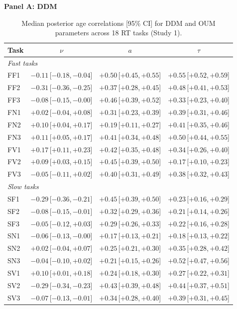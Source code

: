 \begin{table}[ht]
\centering
\caption{Median posterior age correlations [95\% CI] for DDM and OUM parameters across 18 RT tasks (Study 1).}
\label{tab:age_correlations_sfi}
\tiny
\setlength{\tabcolsep}{3pt}
\renewcommand{\arraystretch}{0.9}

\textbf{Panel A: DDM}\par\vspace{2pt}
\begin{tabular}{l ccc}
\toprule
Task & $\nu$ & $a$ & $\tau$ \\
\midrule
\multicolumn{4}{l}{\textit{Fast tasks}} \\
FF1 & $-0.11$\,[$-0.18$,\,$-0.04$] & $+0.50$\,[$+0.45$,\,$+0.55$] & $+0.55$\,[$+0.52$,\,$+0.59$] \\
FF2 & $-0.31$\,[$-0.36$,\,$-0.25$] & $+0.37$\,[$+0.28$,\,$+0.45$] & $+0.48$\,[$+0.41$,\,$+0.53$] \\
FF3 & $-0.08$\,[$-0.15$,\,$-0.00$] & $+0.46$\,[$+0.39$,\,$+0.52$] & $+0.33$\,[$+0.23$,\,$+0.40$] \\
FN1 & $+0.02$\,[$-0.04$,\,$+0.08$] & $+0.31$\,[$+0.23$,\,$+0.39$] & $+0.39$\,[$+0.31$,\,$+0.46$] \\
FN2 & $+0.10$\,[$+0.04$,\,$+0.17$] & $+0.19$\,[$+0.11$,\,$+0.27$] & $+0.41$\,[$+0.35$,\,$+0.46$] \\
FN3 & $+0.11$\,[$+0.05$,\,$+0.17$] & $+0.41$\,[$+0.34$,\,$+0.48$] & $+0.50$\,[$+0.44$,\,$+0.55$] \\
FV1 & $+0.17$\,[$+0.11$,\,$+0.23$] & $+0.42$\,[$+0.35$,\,$+0.48$] & $+0.34$\,[$+0.26$,\,$+0.40$] \\
FV2 & $+0.09$\,[$+0.03$,\,$+0.15$] & $+0.45$\,[$+0.39$,\,$+0.50$] & $+0.17$\,[$+0.10$,\,$+0.23$] \\
FV3 & $-0.05$\,[$-0.11$,\,$+0.02$] & $+0.40$\,[$+0.31$,\,$+0.49$] & $+0.38$\,[$+0.32$,\,$+0.43$] \\
\multicolumn{4}{l}{\textit{Slow tasks}} \\
SF1 & $-0.29$\,[$-0.36$,\,$-0.21$] & $+0.45$\,[$+0.39$,\,$+0.50$] & $+0.23$\,[$+0.16$,\,$+0.29$] \\
SF2 & $-0.08$\,[$-0.15$,\,$-0.01$] & $+0.32$\,[$+0.29$,\,$+0.36$] & $+0.21$\,[$+0.14$,\,$+0.26$] \\
SF3 & $-0.05$\,[$-0.12$,\,$+0.03$] & $+0.29$\,[$+0.26$,\,$+0.33$] & $+0.22$\,[$+0.16$,\,$+0.28$] \\
SN1 & $-0.06$\,[$-0.13$,\,$-0.00$] & $+0.17$\,[$+0.13$,\,$+0.21$] & $+0.18$\,[$+0.13$,\,$+0.22$] \\
SN2 & $+0.02$\,[$-0.04$,\,$+0.07$] & $+0.25$\,[$+0.21$,\,$+0.30$] & $+0.35$\,[$+0.28$,\,$+0.42$] \\
SN3 & $-0.04$\,[$-0.10$,\,$+0.02$] & $+0.21$\,[$+0.15$,\,$+0.26$] & $+0.52$\,[$+0.47$,\,$+0.56$] \\
SV1 & $+0.10$\,[$+0.01$,\,$+0.18$] & $+0.24$\,[$+0.18$,\,$+0.30$] & $+0.27$\,[$+0.22$,\,$+0.31$] \\
SV2 & $-0.29$\,[$-0.34$,\,$-0.23$] & $+0.43$\,[$+0.39$,\,$+0.48$] & $+0.44$\,[$+0.37$,\,$+0.51$] \\
SV3 & $-0.07$\,[$-0.13$,\,$-0.01$] & $+0.34$\,[$+0.28$,\,$+0.40$] & $+0.39$\,[$+0.31$,\,$+0.45$] \\
\bottomrule
\end{tabular}


\end{table}
